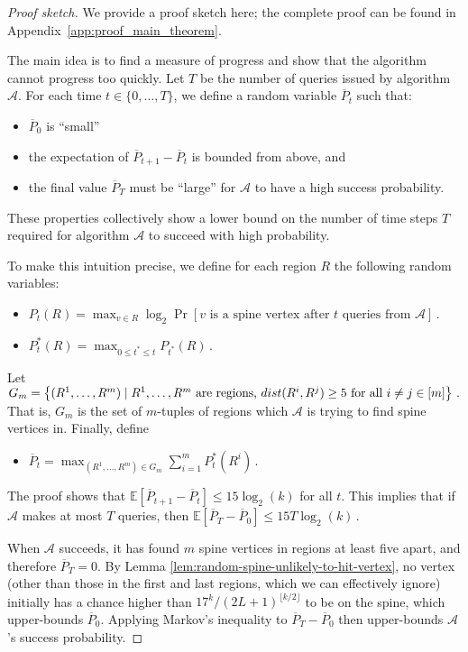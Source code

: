 \documentclass[11pt]{article}
\begin{document}
\begin{proof}[Proof sketch]
We provide a proof sketch here; the complete proof can be found in Appendix~\ref{app:proof_main_theorem}.

The main idea is to find a measure of progress and show  that the algorithm cannot progress too quickly. Let $T$ be the number of queries issued by algorithm $\mathcal{A}$. For each time $t \in \{0, \ldots, T\}$, we define a random variable $\overline{P}_t$ such that: 
\begin{itemize} 
\item $\overline{P}_0$ is ``small''
\item the expectation of $\overline{P}_{t+1} - \overline{P}_t$ is  bounded from above, and
\item the final value $\overline{P}_T$ must be ``large'' 
for $\mathcal{A}$ to have a high success probability. 
\end{itemize} 
These properties collectively show a lower bound on the number of time steps 
$T$ required for  algorithm $\mathcal{A}$ to succeed with high probability.

To make this intuition precise, we define for each region $R$ the following random variables:
\begin{itemize}
   \item  $P_t(R) = \max_{v \in R} \log_2 \Pr \left[\text{$v$ is a spine vertex after $t$ queries from $\mathcal{A}$}\right] \,.  $
   \item $ P^*_t(R) = \max_{0 \leq t^* \leq t} P_{t^*}(R) \,. $ 
\end{itemize}
Let 
$     G_m = \left\{(R^1, \ldots, R^m) \mid R^1, \ldots, R^m \mbox{ are regions, } dist(R^i, R^j) \geq 5 \mbox{ for all } i \neq j \in [m]\right\} \notag  \,.  $ 
That is, $G_m$ is the set of $m$-tuples of regions which $\mathcal{A}$ is trying to find spine vertices in. Finally, define 
\begin{itemize}
\item $ \overline{P}_t = \max_{(R^1, \ldots, R^m) \in G_m} \sum_{i=1}^m P^*_t(R^i) \,. $
\end{itemize}

The proof shows that  
$\mathbb{E} [\overline{P}_{t+1} - \overline{P}_t] \leq 15 \log_2(k)$ for  all $t$. 
This implies that if $\mathcal{A}$  makes at most $T$ queries, then 
$ \mathbb{E} [\overline{P}_T - \overline{P}_0]  \leq 15 T \log_2(k) \,.$

When $\mathcal{A}$ succeeds, it has found $m$ spine vertices in regions at least five apart, and therefore $\overline{P}_T = 0$. By Lemma \ref{lem:random-spine-unlikely-to-hit-vertex}, no vertex (other than those in the first and last regions, which we can effectively ignore) initially has a chance higher than $17^k / (2L+1)^{\lfloor k/2 \rfloor}$ to be on the spine, which upper-bounds $\overline{P}_0$. Applying Markov's inequality to $\overline{P}_T - \overline{P}_0$ then upper-bounds $\mathcal{A}$'s success probability. %
\end{proof}
\end{document}

